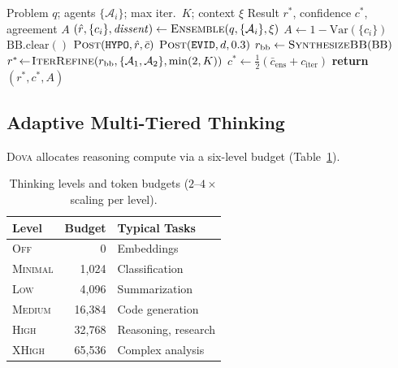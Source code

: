 \documentclass{article}
\theoremstyle{plain}
\theoremstyle{definition}
\newcommand{\algorithmicreturn}{\textbf{return}}
\newcommand{\RETURN}{\STATE \algorithmicreturn{} }
\newcommand{\dova}{\textsc{Dova}}
\begin{document}
\begin{algorithm}[ht!]
\caption{Hybrid Collaborative Reasoning}
\label{alg:hybrid}
\begin{algorithmic}
\REQUIRE Problem $q$; agents $\{\mathcal{A}_i\}$; max iter.\ $K$; context $\xi$
\ENSURE Result $r^*$, confidence $c^*$, agreement $A$
\STATE {}
\STATE $(\hat{r}, \{c_i\}, \mathit{dissent}) \leftarrow \textsc{Ensemble}(q, \{\mathcal{A}_i\}, \xi)$
\STATE $A \leftarrow 1 - \mathrm{Var}(\{c_i\})$
\STATE {}
\STATE $\mathrm{BB.clear}()$
\STATE $\textsc{Post}(\texttt{HYPO}, \hat{r}, \bar{c})$
  \STATE $\textsc{Post}(\texttt{EVID}, d, 0.3)$
\ENDFOR
\STATE $r_\mathrm{bb} \leftarrow \textsc{SynthesizeBB}(\mathrm{BB})$
\STATE {}
\STATE $r^* \!\leftarrow\! \textsc{IterRefine}(r_\mathrm{bb}, \{\mathcal{A}_1, \mathcal{A}_2\}, \min(2, K))$
\STATE $c^* \leftarrow \tfrac{1}{2}(\bar{c}_\mathrm{ens} + c_\mathrm{iter})$
\RETURN $(r^*, c^*, A)$
\end{algorithmic}
\end{algorithm}

\subsection{Adaptive Multi-Tiered Thinking}\label{sec:thinking}

\dova{} allocates reasoning compute via a six-level budget
(Table~\ref{tab:thinking}).

\begin{table}[t]
\caption{Thinking levels and token budgets ($2$--$4\times$ scaling per level).}
\label{tab:thinking}
\centering
\small
\begin{tabular}{@{}lrl@{}}
\toprule
\textbf{Level} & \textbf{Budget} & \textbf{Typical Tasks} \\
\midrule
\textsc{Off}     & 0       & Embeddings \\
\textsc{Minimal} & 1,024   & Classification \\
\textsc{Low}     & 4,096   & Summarization \\
\textsc{Medium}  & 16,384  & Code generation \\
\textsc{High}    & 32,768  & Reasoning, research \\
\textsc{XHigh}   & 65,536  & Complex analysis \\
\bottomrule
\end{tabular}
\end{table}
\end{document}
